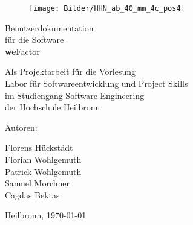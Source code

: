 %
%

\thispagestyle{empty}

\begin{figure}
\flushright						%
\texttt{[image: Bilder/HHN\_ab\_40\_mm\_4c\_pos4]}\\
\end{figure}

\vspace*{1.0cm}

\begin{center}
{\Huge Benutzerdokumentation\\
\vspace{0.1cm} 
für die Software\\
\vspace{0.1cm} 
\textbf{we}Factor}

\vspace{3.0cm}

	{\Large Als Projektarbeit für die Vorlesung\\
\vspace{0.1cm}
	Labor für Softwareentwicklung und Project Skills\\
\vspace{0.1cm}
	im Studiengang Software Engineering\\
\vspace{0.1cm}
	der Hochschule Heilbronn\\

}
\end{center}

\vspace*{3.0cm}





Autoren:\\
{\Large
Florens Hückstädt\\
			Florian Wohlgemuth\\
			Patrick Wohlgemuth\\
			Samuel Morchner\\
			Cagdas Bektas

 }
\vspace{1,5cm}
Heilbronn, \today
